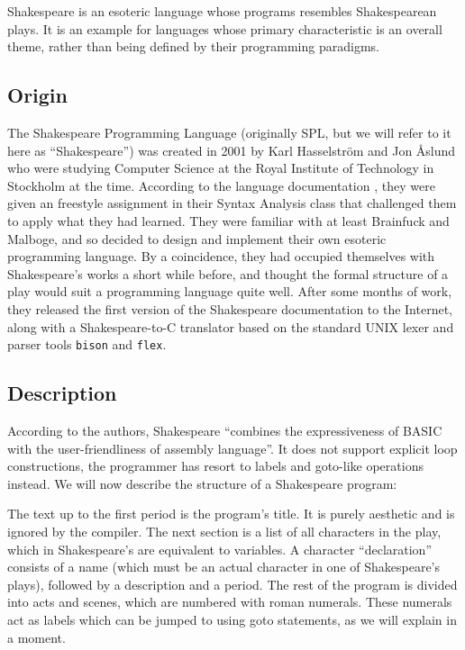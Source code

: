Shakespeare is an esoteric language whose programs resembles Shakespearean plays. It is an example for languages whose primary characteristic is an overall theme, rather than being defined by their programming paradigms.

\subsection{Origin}

The Shakespeare Programming Language (originally SPL, but we will refer to it here as “Shakespeare”) was created in 2001 by Karl Hasselström and Jon Åslund who were studying Computer Science at the Royal Institute of Technology in Stockholm at the time. According to the language documentation \cite{hasselstrom2001shakespeare}, they were given an freestyle assignment in their Syntax Analysis class that challenged them to apply what they had learned. They were familiar with at least Brainfuck and Malboge, and so decided to design and implement their own esoteric programming language. By a coincidence, they had occupied themselves with Shakespeare's works a short while before, and thought the formal structure of a play would suit a programming language quite well. After some months of work, they released the first version of the Shakespeare documentation to the Internet, along with a Shakespeare-to-C translator based on the standard UNIX lexer and parser tools \texttt{bison} and \texttt{flex}.

\subsection{Description}

According to the authors, Shakespeare “combines the expressiveness of BASIC with the user-friendliness of assembly language”. It does not support explicit loop constructions, the programmer has resort to labels and goto-like operations instead. We will now describe the structure of a Shakespeare program:

The text up to the first period is the program's title. It is purely aesthetic and is ignored by the compiler. The next section is a list of all characters in the play, which in Shakespeare's are equivalent to variables. A character “declaration” consists of a name (which must be an actual character in one of Shakespeare's plays), followed by a description and a period. The rest of the program is divided into acts and scenes, which are numbered with roman numerals. These numerals act as labels which can be jumped to using goto statements, as we will explain in a moment.

